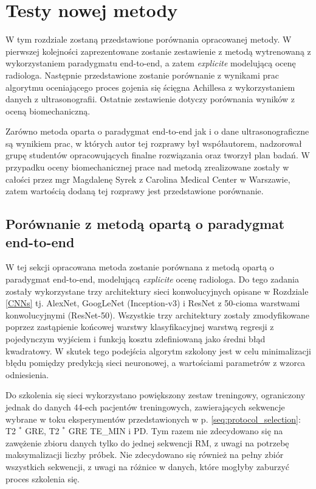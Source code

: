 \chapter{Testy nowej metody}

W tym rozdziale zostaną przedstawione porównania opracowanej metody. W pierwszej kolejności zaprezentowane zostanie zestawienie z metodą wytrenowaną z wykorzystaniem paradygmatu end-to-end, a zatem \textit{explicite} modelującą ocenę radiologa. Następnie przedstawione zostanie porównanie z wynikami prac algorytmu oceniającego proces gojenia się ścięgna Achillesa z wykorzystaniem danych z ultrasonografii. Ostatnie zestawienie dotyczy porównania wyników z oceną biomechaniczną.

Zarówno metoda oparta o paradygmat end-to-end jak i o dane ultrasonograficzne są wynikiem prac, w których autor tej rozprawy był współautorem, nadzorował grupę studentów opracowujących finalne rozwiązania oraz tworzył plan badań. W przypadku oceny biomechanicznej prace nad metodą zrealizowane zostały w całości przez mgr Magdalenę Syrek z Carolina Medical Center w Warszawie, zatem wartością dodaną tej rozprawy jest przedstawione porównanie.   

\section{Porównanie z metodą opartą o paradygmat end-to-end}
\label{seq:end-to-end}
W tej sekcji opracowana metoda zostanie porównana z metodą opartą o paradygmat end-to-end, modelującą \textit{explicite} ocenę radiologa. Do tego zadania zostały wykorzystane trzy architektury sieci konwolucyjnych opisane w Rozdziale \ref{CNNs} tj. AlexNet, GoogLeNet (Inception-v3) i ResNet z 50-cioma warstwami konwolucyjnymi (ResNet-50). Wszystkie trzy architektury zostały zmodyfikowane poprzez zastąpienie końcowej warstwy klasyfikacyjnej warstwą regresji z pojedynczym wyjściem i funkcją kosztu zdefiniowaną jako średni błąd kwadratowy. W skutek tego podejścia algorytm szkolony jest w celu minimalizacji błędu pomiędzy predykcją sieci neuronowej, a wartościami parametrów z wzorca odniesienia. 

Do szkolenia się sieci wykorzystano powiększony zestaw treningowy, ograniczony jednak do danych 44-ech pacjentów treningowych, zawierających sekwencje wybrane w toku eksperymentów przedstawionych w p. \ref{seq:protocol_selection}: T2 $^\ast$ GRE, T2 $^\ast$ GRE TE\_MIN i PD. Tym razem nie zdecydowano się na zawężenie zbioru danych tylko do jednej sekwencji RM, z uwagi na potrzebę maksymalizacji liczby próbek. Nie zdecydowano się również na pełny zbiór wszystkich sekwencji, z uwagi na różnice w danych, które mogłyby zaburzyć proces szkolenia się. 


